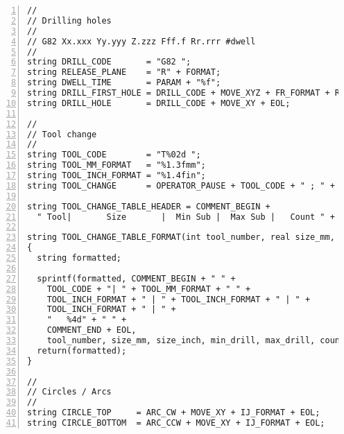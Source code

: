 \documentclass[11pt]{book}
\begin{document}
\begin{lstlisting}[numbers=left,
	breaklines=true,	
	numberstyle=\tiny\color{gray},
	basicstyle=\ttfamily\tiny
]
//
// Drilling holes
//
// G82 Xx.xxx Yy.yyy Z.zzz Fff.f Rr.rrr #dwell
//
string DRILL_CODE       = "G82 ";
string RELEASE_PLANE    = "R" + FORMAT;
string DWELL_TIME       = PARAM + "%f";
string DRILL_FIRST_HOLE = DRILL_CODE + MOVE_XYZ + FR_FORMAT + RELEASE_PLANE + DWELL_TIME + EOL;
string DRILL_HOLE       = DRILL_CODE + MOVE_XY + EOL;

//
// Tool change
//
string TOOL_CODE        = "T%02d ";
string TOOL_MM_FORMAT   = "%1.3fmm";
string TOOL_INCH_FORMAT = "%1.4fin";
string TOOL_CHANGE      = OPERATOR_PAUSE + TOOL_CODE + " ; " + FORMAT + EOL;

string TOOL_CHANGE_TABLE_HEADER = COMMENT_BEGIN + 
  " Tool|       Size       |  Min Sub |  Max Sub |   Count " + COMMENT_END + EOL;

string TOOL_CHANGE_TABLE_FORMAT(int tool_number, real size_mm, real size_inch, real min_drill, real max_drill, int count)
{
  string formatted;
  
  sprintf(formatted, COMMENT_BEGIN + " " + 
    TOOL_CODE + "| " + TOOL_MM_FORMAT + " " +
    TOOL_INCH_FORMAT + " | " + TOOL_INCH_FORMAT + " | " +
    TOOL_INCH_FORMAT + " | " + 
    "   %4d" + " " + 
    COMMENT_END + EOL,
    tool_number, size_mm, size_inch, min_drill, max_drill, count);
  return(formatted);
}

//
// Circles / Arcs
//
string CIRCLE_TOP     = ARC_CW + MOVE_XY + IJ_FORMAT + EOL;
string CIRCLE_BOTTOM  = ARC_CCW + MOVE_XY + IJ_FORMAT + EOL;

\end{lstlisting}


\backmatter

\printindex
\end{document}
